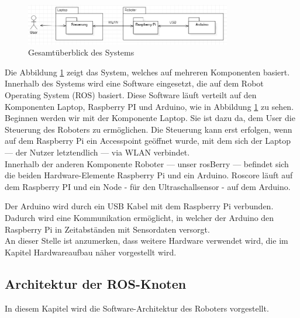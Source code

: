 \documentclass[conference]{IEEEtran}
\begin{document}
\begin{figure}%
	\centering
	\includegraphics[width=9cm]{img/Gesamtsystem.PNG}
	\caption{Gesamtüberblick des Systems}
	\label{Gesamtzusammenhang}
\end{figure}
Die Abbildung \ref{Gesamtzusammenhang} zeigt das System, welches auf mehreren Komponenten basiert.
Innerhalb des Systems wird eine Software eingesetzt, die auf dem Robot Operating System (ROS) basiert.
Diese Software läuft verteilt auf den Komponenten Laptop, Raspberry PI und Arduino, wie in Abbildung \ref{Gesamtzusammenhang} zu sehen.
\\
Beginnen werden wir mit der Komponente Laptop.
Sie ist dazu da, dem User die Steuerung des Roboters zu ermöglichen.
Die Steuerung kann erst erfolgen, wenn auf dem Raspberry Pi ein Accesspoint geöffnet wurde, mit dem sich der Laptop — der Nutzer letztendlich — via WLAN verbindet.
\\
Innerhalb der anderen Komponente Roboter — unser rosBerry — befindet sich die beiden Hardware-Elemente Raspberry Pi und ein Arduino. Roscore läuft auf dem Raspberry PI und ein Node - für den Ultraschallsensor - auf dem Arduino.

Der Arduino wird durch ein USB Kabel mit dem Raspberry Pi verbunden.
Dadurch wird eine Kommunikation ermöglicht, in welcher der Arduino den Raspberry Pi in Zeitabständen mit Sensordaten versorgt.
\\
An dieser Stelle ist anzumerken, dass weitere Hardware verwendet wird, die im Kapitel Hardwareaufbau näher vorgestellt wird.

\subsection{Architektur der ROS-Knoten}\label{sec:Architektur}

In diesem Kapitel wird die Software-Architektur des Roboters vorgestellt.
\end{document}
